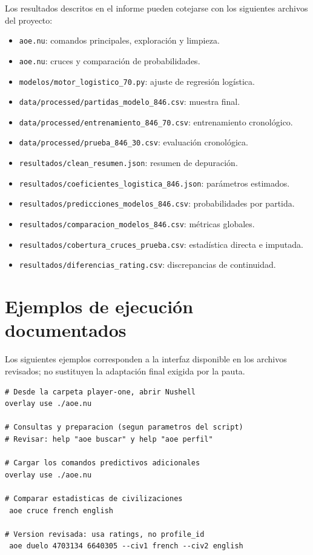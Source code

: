 \documentclass[12pt,a4paper]{article}
\begin{document}
Los resultados descritos en el informe pueden cotejarse con los siguientes archivos del proyecto:
\begin{itemize}[leftmargin=0.8cm]
\item \texttt{aoe.nu}: comandos principales, exploración y limpieza.
\item \texttt{aoe.nu}: cruces y comparación de probabilidades.
\item \texttt{modelos/motor\_logistico\_70.py}: ajuste de regresión logística.
\item \texttt{data/processed/partidas\_modelo\_846.csv}: muestra final.
\item \texttt{data/processed/entrenamiento\_846\_70.csv}: entrenamiento cronológico.
\item \texttt{data/processed/prueba\_846\_30.csv}: evaluación cronológica.
\item \texttt{resultados/clean\_resumen.json}: resumen de depuración.
\item \texttt{resultados/coeficientes\_logistica\_846.json}: parámetros estimados.
\item \texttt{resultados/predicciones\_modelos\_846.csv}: probabilidades por partida.
\item \texttt{resultados/comparacion\_modelos\_846.csv}: métricas globales.
\item \texttt{resultados/cobertura\_cruces\_prueba.csv}: estadística directa e imputada.
\item \texttt{resultados/diferencias\_rating.csv}: discrepancias de continuidad.
\end{itemize}

\section{Ejemplos de ejecución documentados}

Los siguientes ejemplos corresponden a la interfaz disponible en los archivos revisados; no sustituyen la adaptación final exigida por la pauta.
\begin{lstlisting}
# Desde la carpeta player-one, abrir Nushell
overlay use ./aoe.nu

# Consultas y preparacion (segun parametros del script)
# Revisar: help "aoe buscar" y help "aoe perfil"

# Cargar los comandos predictivos adicionales
overlay use ./aoe.nu

# Comparar estadisticas de civilizaciones
 aoe cruce french english

# Version revisada: usa ratings, no profile_id
 aoe duelo 4703134 6640305 --civ1 french --civ2 english
\end{lstlisting}
\end{document}
